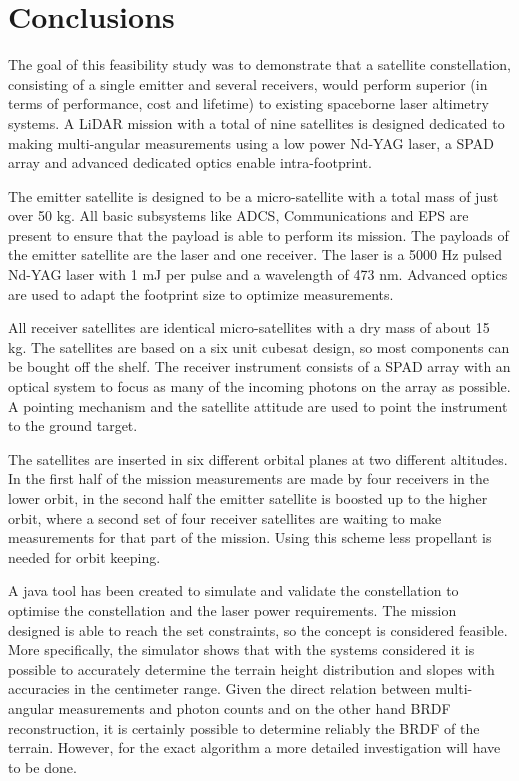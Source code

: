 \section{Conclusions}
\label{frCRconclusions}
The goal of this feasibility study was to demonstrate that a satellite constellation, consisting of a single emitter and several receivers, would perform
superior (in terms of performance, cost and lifetime) to existing spaceborne laser altimetry systems. A \ac{LiDAR} mission with a total of nine satellites is designed dedicated to making multi-angular measurements using a low power \ac{Nd-YAG} \ac{laser}, a \ac{SPAD} array and advanced dedicated optics enable intra-footprint. 

The emitter satellite is designed to be a micro-satellite with a total mass of just over 50 kg. All basic subsystems like \ac{ADCS}, Communications and \ac{EPS} are present to ensure that the payload is able to perform its mission. The payloads of the emitter satellite are the \ac{laser} and one receiver. The \ac{laser} is a 5000 Hz pulsed \ac{Nd-YAG} \ac{laser} with 1 mJ per pulse and a wavelength of 473 nm. Advanced optics are used to adapt the footprint size to optimize measurements.

All receiver satellites are identical micro-satellites with a dry mass of about 15 kg. The satellites are based on a six unit cubesat design, so most components can be bought off the shelf. The receiver instrument consists of a \ac{SPAD} array with an optical system to focus as many of the incoming photons on the array as possible. A pointing mechanism and the satellite attitude are used to point the instrument to the ground target.

The satellites are inserted in six different orbital planes at two different altitudes. In the first half of the mission measurements are made by four receivers in the lower orbit, in the second half the emitter satellite is boosted up to the higher orbit, where a second set of four receiver satellites are waiting to make measurements for that part of the mission. Using this scheme less propellant is needed for orbit keeping.

A java tool has been created to simulate and validate the constellation to optimise the constellation and the laser power requirements. The mission designed is able to reach the set constraints, so the concept is considered feasible. More specifically, the simulator shows that with the systems considered it is possible to accurately determine the terrain height distribution and slopes with accuracies in the centimeter range. Given the direct relation between multi-angular measurements and photon counts and on the other hand \ac{BRDF} reconstruction, it is certainly possible to determine reliably the \ac{BRDF} of the terrain. However, for the exact algorithm a more detailed investigation will have to be done.

